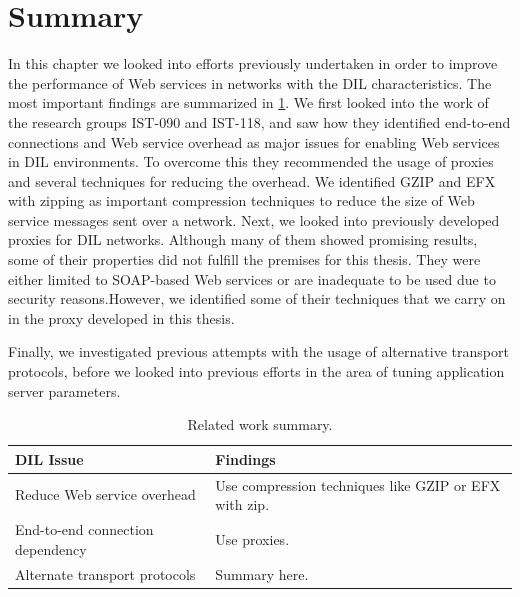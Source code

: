 \section{Summary}

In this chapter we looked into efforts previously undertaken in order to improve
the performance of Web services in networks with the DIL characteristics. The
most important findings are summarized in \cref{table:related-work-summary}. We
first looked into the work of the research groups IST-090 and IST-118, and saw
how they identified end-to-end connections and Web service overhead as major
issues for enabling Web services in DIL environments. To overcome this they
recommended the usage of proxies and several techniques for reducing the
overhead. We identified GZIP and EFX with zipping as important
compression techniques to reduce the size of Web service messages sent over a
network. Next, we looked into previously developed proxies for DIL networks.
Although many of them showed promising results, some of their properties did not
fulfill the premises for this thesis. They were either limited to SOAP-based Web
services or are inadequate to be used due to security reasons.However, we
identified some of their techniques that we carry on in the proxy developed in
this thesis.

Finally, we investigated previous attempts with the usage of alternative
transport protocols, before we looked into previous efforts in the area of
tuning application server parameters.

\begin{table}[h]
\begin{tabularx}{\textwidth}{| X | X |}
\hline
  \textbf{DIL Issue} & \textbf{Findings} \\ \hline

  Reduce Web service overhead  & Use compression techniques like GZIP or EFX
  with zip.\\ \hline

  End-to-end connection dependency & Use proxies. \\ \hline

  Alternate transport protocols & Summary here. \\ \hline
\end{tabularx}
\caption{Related work summary.}
\label{table:related-work-summary}
\end{table}
